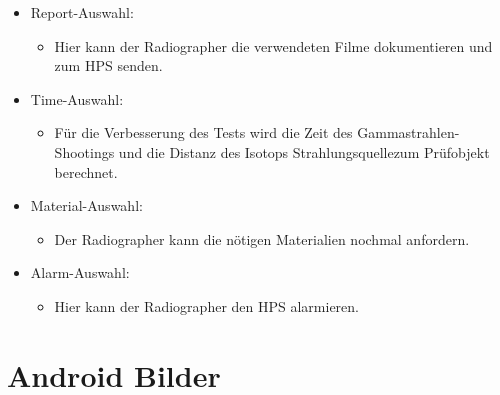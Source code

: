 \begin{itemize}
\begin{itemize}
\begin{itemize}
\end{itemize}
\item Report-Auswahl:
\begin{itemize}
\item Hier kann der Radiographer die verwendeten Filme dokumentieren und zum HPS senden.

\end{itemize}
\item Time-Auswahl:
\begin{itemize}
\item Für die Verbesserung des Tests wird die Zeit des Gammastrahlen-Shootings
      und die Distanz des Isotops \grqq Strahlungsquelle\grqq zum Prüfobjekt berechnet.
\end{itemize}
\item Material-Auswahl:
\begin{itemize}
\item Der Radiographer kann die nötigen Materialien nochmal anfordern. 
\end{itemize}
\item Alarm-Auswahl:
\begin{itemize}
\item Hier kann der Radiographer den HPS alarmieren.
\end{itemize}
\end{itemize}
\end{itemize}
\chapter{Android Bilder}
